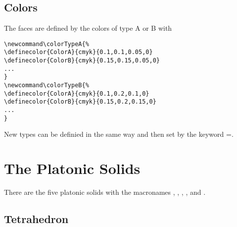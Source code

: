 \documentclass[11pt,english,BCOR10mm,DIV12,bibliography=totoc,parskip=false,smallheadings
    headexclude,footexclude,oneside]{pst-doc}
\begin{document}
\subsection{Colors}
The faces are defined by the colors of type A or B with 
\begin{verbatim}
\newcommand\colorTypeA{%
\definecolor{ColorA}{cmyk}{0.1,0.1,0.05,0}
\definecolor{ColorB}{cmyk}{0.15,0.15,0.05,0}
...
}
\newcommand\colorTypeB{%
\definecolor{ColorA}{cmyk}{0.1,0.2,0.1,0}
\definecolor{ColorB}{cmyk}{0.15,0.2,0.15,0}
...
}
\end{verbatim}

New types can be definied in the same way and then set by the keyword =.

\begin{LTXexample}[width=5cm,rframe=]
\newcommand\colorTypeC{%
  \colorlet{ColorA}{red}
  \colorlet{ColorB}{green}
  \colorlet{ColorC}{blue}
  \definecolor{ColorD}{rgb}{0.55,0.2,0.15}
}
\psTetrahedron[colorType=C]
\end{LTXexample}


\section{The Platonic Solids}
There are the five platonic solids with the macronames 
, , , , 
and .


\subsection{Tetrahedron}

\begin{LTXexample}[width=5cm,rframe=]
\psTetrahedron
\end{LTXexample}

\begin{LTXexample}[width=5cm,rframe=]
\psTetrahedron[Viewpoint=1 1.2 0.5]
\end{LTXexample}

\begin{LTXexample}[width=5cm,rframe=]
\psTetrahedron[Frame=false,Viewpoint=0.7 -0.5 -0.8]
\end{LTXexample}

\begin{LTXexample}[pos=t,rframe=]
\psTetrahedron[Frame=false,Viewpoint=1 1.2 0.7] 
\psTetrahedron[Frame=false,Viewpoint=-1 0.5 2] 
\psTetrahedron[Frame=false,Viewpoint=0.7 -0.5 -0.8]
\end{LTXexample}
\end{document}
